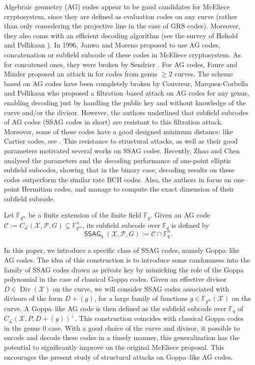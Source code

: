 \documentclass[a4paper]{article}
\theoremstyle{definition}
\theoremstyle{remark}
\newcommand{\calP}{\mathcal{P}}
\newcommand{\calL}{\mathcal{L}}
\newcommand{\calC}{\mathcal{C}}
\newcommand{\calX}{\mathcal{X}}
\newcommand{\fqm}{\mathbb{F}_{q^m}}
\newcommand{\fq}{\mathbb{F}_{q}}
\newcommand{\Div}{\operatorname{Div}}
\newcommand{\ssag}[1]{\operatorname{\mathsf{SSAG}}_{q}\left(#1\right)}
\begin{document}
Algebraic geometry (AG) codes appear to be good candidates for McEliece cryptosystem, since they are defined as evaluation codes on any curve (rather than only consedering the projective line in the case of GRS codes). Moreover, they also come with an efficient decoding algorithm (see the survey of Høhold and Pellikaan \cite{HP95}).
In 1996, Janwa and Moreno \cite{JM96} proposed to use AG codes, concatenation or subfield subcode of these codes in McEliece cryptosystem. As for concatened ones, they were broken by Sendrier \cite{Sen94}. For AG codes, Faure and Minder proposed an attack in \cite{FM08,Min07,Fau09} for codes from genus $\geq 2$ curves. The scheme based on AG codes have been completely broken by Couvreur, Marquez-Corbella and Pellikaan \cite{CMR17} who proposed a filtration--based attack on AG codes for any genus, enabling decoding just by handling the public key and without knowledge of the curve and/or the divisor. However, the authors underlined that subfield subcodes of AG codes (SSAG codes in short) are resistant to this filtration attack. Moreover, some of these codes have a good designed minimum distance: like Cartier codes, see \cite{Cou14}. This resistance to structural attacks, as well as their good parameters motivated several works on SSAG codes. Recently, Zhao and Chen \cite{ZC22} analysed the parameters and the decoding performance of one-point elliptic subfield subcodes, showing that in the binary case, decoding results on these codes outperform the similar rate BCH codes. Also, the authors in \cite{PJ14,EKN21} focus on one--point Hermitian codes, and manage to compute the exact dimension of their subfield subcode. 

\medskip

Let $\fqm$ be a finite extension of the finite field $\fq$. Given an AG code $\calC :=C_{\calL}(\calX,\calP,G) \subseteq \fqm^n$, its subfield subcode over $\fq$ is defined by 
$$\ssag{\calX,\calP,G} := \calC \cap \fq^n.$$  

In this paper, we introduce a specific class of SSAG codes, namely Goppa--like AG codes. The idea of this construction is to introduce  some randomness into the family of SSAG codes drawn as private key by mimicking the role of the Goppa polynomial in the case of classical Goppa codes. Given an effective divisor $D\in \Div(\calX)$ on the curve, we will consider SSAG codes associated with divisors of the form $D+(g)$, for a large family of functions $g \in \fqm(\calX)$ on the curve. A Goppa--like AG code is then defined as the subfield subcode over $\fq$ of $C_{\calL}(\calX,P,D+(g))^{\perp}$. This construction coincides with classical Goppa codes in the genus 0 case.%
With a good choice of the curve and divisor, it possible to encode and decode these codes in a timely manner, this generalization has the potential to significantly improve on the original McEliece proposal. This encourages the present study of structural attacks on Goppa--like AG codes. 
\end{document}

